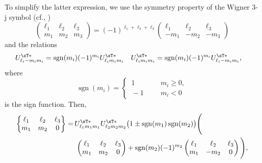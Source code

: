 To simplify the latter expression, we use the symmetry property of the Wigner 3-j symbol (cf., \citep{varshalovich_quantum_1988})
\begin{equation}\label{eq:3-j-sign-reversal}
    \begin{pmatrix}
        \ell_1 & \ell_2 & \ell_3 \\ m_1 & m_2 & m_3
    \end{pmatrix}
    =
    (-1)^{\ell_1 + \ell_2 + \ell_3}
    \begin{pmatrix}
        \ell_1 & \ell_2 & \ell_3 \\ -m_1 & -m_2 & -m_3
    \end{pmatrix}
\end{equation}
and the relations
\begin{align}\label{eq:UT*-relations}
    U^{\sT\ast}_{\ell_i -m_im_i} = \operatorname{sgn}(m_i)(-1)^{m_i}U^{\sT\ast}_{\ell_i m_im_i}
    &&&
    U^{\sT\ast}_{\ell_i m_im_i} = \operatorname{sgn}(m_i)(-1)^{m_i}U^{\sT\ast}_{\ell_i -m_im_i},
\end{align}
where
\begin{equation}
    \operatorname{sgn}(m_i) =
    \left\{
    \begin{aligned}
        \,  1 &&& m_i \ge 0, \\
        \, -1 &&& m_i < 0
    \end{aligned}
    \right.
\end{equation}
is the sign function.
Then,
\begin{equation}\label{eq:w3j-rsph-expr2.1}
\begin{aligned}
    \begin{Bmatrix}
        \ell_1 & \ell_2 & \ell_3 \\ m_1 & m_2 & 0
    \end{Bmatrix}
    =\,&
    U^{\sT\ast}_{\ell_1 m_1m_1} U^{\sT\ast}_{\ell_2 m_2m_2}
    \big( 1 \pm \operatorname{sgn}(m_1)\operatorname{sgn}(m_2) \big)
    \Bigg( \\
    &\,
    \begin{pmatrix}
        \ell_1 & \ell_2 & \ell_3 \\ m_1 & m_2 & 0
    \end{pmatrix}
    +
    \operatorname{sgn}(m_2)(-1)^{m_2}
    \begin{pmatrix}
        \ell_1 & \ell_2 & \ell_3 \\ m_1 & -m_2 & 0
    \end{pmatrix}
    \Bigg)
    ,
\end{aligned}
\end{equation}
